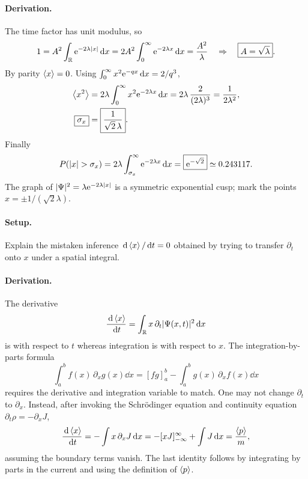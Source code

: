 \paragraph{Derivation.}
The time factor has unit modulus, so
\begin{equation}
1=A^2\int_{\mathbb R}\mathrm{e}^{-2\lambda|x|}\,\mathrm{d} x
=2A^2\int_0^\infty\mathrm{e}^{-2\lambda x}\,\mathrm{d} x
=\frac{A^2}{\lambda}
\quad\Rightarrow\quad \boxed{A=\sqrt\lambda}.
\end{equation}
By parity $\left\langle x\right\rangle=0$. Using $\int_0^\infty x^2\mathrm{e}^{-qx}\,\mathrm{d} x=2/q^3$,
\begin{align}
\left\langle x^2\right\rangle&=2\lambda\int_0^\infty x^2\mathrm{e}^{-2\lambda x}\,\mathrm{d} x
=2\lambda\,\frac{2}{(2\lambda)^3}
=\frac1{2\lambda^2},\\
\boxed{\sigma_x}&=\boxed{\frac1{\sqrt2\,\lambda}}.
\end{align}
Finally
\begin{equation}
P(|x|>\sigma_x)
=2\lambda\int_{\sigma_x}^\infty \e^{-2\lambda x}\dd x
=\boxed{\e^{-\sqrt2}}\simeq0.243117.
\end{equation}
The graph of $|\Psi|^2=\lambda\mathrm{e}^{-2\lambda|x|}$ is a symmetric exponential cusp; mark the points $x=\pm1/(\sqrt2\lambda)$.

\paragraph{Setup.} Explain the mistaken inference $\,\mathrm{d}\left\langle x\right\rangle/\,\mathrm{d} t=0$ obtained by trying to transfer $\partial_t$ onto $x$ under a spatial integral.
\paragraph{Derivation.}
The derivative
\begin{equation}
\frac{\,\mathrm{d}\left\langle x\right\rangle}{\,\mathrm{d} t}=\int_{\mathbb R}x\,\partial_t|\Psi(x,t)|^2\,\mathrm{d} x
\end{equation}
is with respect to $t$ whereas integration is with respect to $x$. The integration-by-parts formula
\begin{equation}
\int_a^b f(x)\,\partial_xg(x)\dd x=[fg]_a^b-\int_a^b g(x)\,\partial_x f(x)\dd x
\end{equation}
requires the derivative and integration variable to match. One may not change $\partial_t$ to $\partial_x$. Instead, after invoking the Schrödinger equation and continuity equation $\partial_t\rho=-\partial_xJ$,
\begin{equation}
\frac{\,\mathrm{d}\left\langle x\right\rangle}{\,\mathrm{d} t}
=-\int x\,\partial_xJ\,\mathrm{d} x
=-[xJ]_{-\infty}^{\infty}+\int J\,\mathrm{d} x
=\frac{\left\langle p\right\rangle}{m},
\end{equation}
assuming the boundary terms vanish. The last identity follows by integrating by parts in the current and using the definition of $\left\langle p\right\rangle$.
